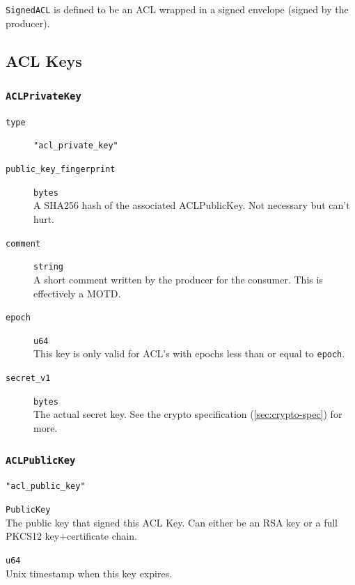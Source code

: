 \documentclass[pdftex,12pt,a4papaer,twoside,notitlepage]{report}
\begin{document}
\begin{appendices}
\texttt{SignedACL} is defined to be an ACL wrapped in a signed envelope (signed
by the producer).

\subsection{ACL Keys}

\subsubsection{\texttt{ACLPrivateKey}}

\begin{leftbar}
\begin{description}
\item[\texttt{type}] \verb="acl_private_key"=
\item[\texttt{public\_key\_fingerprint}] \texttt{bytes} \\
  A SHA256 hash of the associated ACLPublicKey. Not necessary but can't hurt.

\item[\texttt{comment}] \texttt{string} \\
  A short comment written by the producer for the consumer. This is effectively a MOTD.
\item[\texttt{epoch}] \texttt{u64} \\
  This key is only valid for ACL's with epochs less than or equal to \texttt{epoch}.
\item[\texttt{secret\_v1}] \texttt{bytes} \\
  The actual secret key. See the crypto specification (\cref{sec:crypto-spec})
  for more.
\end{description}
\end{leftbar}

\subsubsection{\texttt{ACLPublicKey}}

\begin{leftbar}
\begin{description}[labelindent=2em,leftmargin=3em]
\item[\texttt{type}] \verb="acl_public_key"=
\item[\texttt{signing\_key}] \texttt{PublicKey} \\
  The public key that signed this ACL Key. Can either be an RSA key or a
  full PKCS12 key+certificate chain.

\item[\texttt{expires}] \texttt{u64} \\
  Unix timestamp when this key expires.


\end{description}
\end{leftbar}
\end{appendices}
\end{document}
